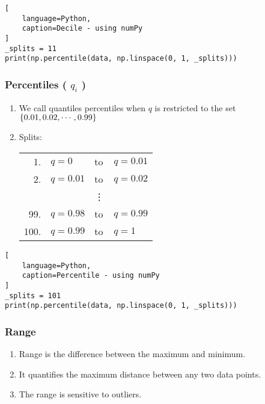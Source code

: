 \begin{lstlisting}[
    language=Python,
    caption=Decile - using numPy
]
_splits = 11
print(np.percentile(data, np.linspace(0, 1, _splits)))
\end{lstlisting}


\subsubsection{Percentiles ( $q_i$ ) \cite{statistics/book/Statistics-for-Data-Scientists/Maurits-Kaptein}} \label{Data/Describing Data/Central Tendency/Percentiles}

\begin{enumerate}
    \item We call quantiles percentiles when $q$ is restricted to the set $\left\{0.01, 0.02,\cdots, 0.99\right\}$ \hfill \cite{statistics/book/Statistics-for-Data-Scientists/Maurits-Kaptein}

    \item Splits: \\
    \begin{tabular}{r l l l} %
        1. & $q = 0$ & to & $q = 0.01$ \\
        2. & $q = 0.01$ & to & $q = 0.02$ \\
        & & \vdots & \\
        99. & $q = 0.98$ & to & $q = 0.99$ \\
        100. & $q = 0.99$ & to & $q = 1$ \\
    \end{tabular}
\end{enumerate}


\begin{lstlisting}[
    language=Python,
    caption=Percentile - using numPy
]
_splits = 101
print(np.percentile(data, np.linspace(0, 1, _splits)))
\end{lstlisting}


\subsubsection{Range \cite{statistics/book/Statistics-for-Data-Scientists/Maurits-Kaptein}} \label{Data/Describing Data/Central Tendency/Range}

\begin{enumerate}
    \item Range is the difference between the maximum and minimum. \hfill \cite{statistics/book/Statistics-for-Data-Scientists/Maurits-Kaptein}

    \item It quantifies the maximum distance between any two data points. \hfill \cite{statistics/book/Statistics-for-Data-Scientists/Maurits-Kaptein}

    \item The range is sensitive to outliers. \hfill \cite{statistics/book/Statistics-for-Data-Scientists/Maurits-Kaptein}
\end{enumerate}


